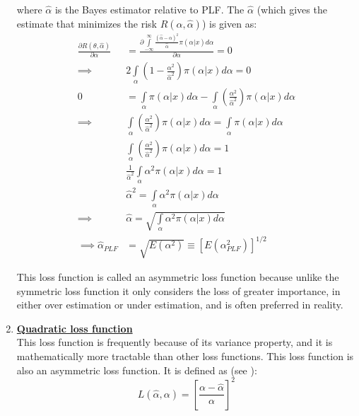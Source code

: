\documentclass[a4paper,12pt]{report}
\begin{document}
\begin{enumerate}
	
	where $\hat{\alpha}$ is the Bayes estimator relative to PLF. The $\hat{\alpha}$ (which gives the estimate that minimizes the risk $R(\alpha,\hat{\alpha})$) is given as:
	\begin{equation}\label{3.33}\begin{split}
	\frac{\partial R(\theta,\hat{\alpha})}{\partial \alpha}&=\frac{\partial\int\limits_{-\infty}^{\infty}\frac{(\hat{\alpha}-\alpha)^2}{\hat{\alpha}}\pi(\alpha|x)d\alpha}{\partial\alpha}=0\\
	\implies &2\int\limits_{\alpha}\left(1-\frac{\alpha^2}{\hat{\alpha}^2}\right)\pi(\alpha|x)d\alpha=0\\
	0&=\int\limits_{\alpha}\pi(\alpha|x)d\alpha-\int\limits_{\alpha}\left(\frac{\alpha^2}{\hat{\alpha}^2}\right)\pi(\alpha|x)d\alpha\\
	\implies&\int\limits_{\alpha}\left(\frac{\alpha^2}{\hat{\alpha}^2}\right)\pi(\alpha|x)d\alpha=\int\limits_{\alpha}\pi(\alpha|x)d\alpha\\
	&\int\limits_{\alpha}\left(\frac{\alpha^2}{\hat{\alpha}^2}\right)\pi(\alpha|x)d\alpha=1\\
	&\frac{1}{\hat{\alpha}^2}\int\limits_{\alpha}\alpha^2\pi(\alpha|x)d\alpha=1\\
	&\hat{\alpha}^2=\int\limits_{\alpha}\alpha^2\pi(\alpha|x)d\alpha\\
	\implies&\hat{\alpha}=\sqrt{\int\limits_{\alpha}\alpha^2\pi(\alpha|x)d\alpha}\\
	\implies\hat{\alpha}_{PLF}&=\sqrt{E(\alpha^2)}\equiv[E(\alpha_{PLF}^2)]^{1/2}
	\end{split}
	\end{equation}
	
	This loss function is called an asymmetric loss function because unlike the symmetric loss function it only considers the loss of greater importance, in either over estimation or under estimation, and is often preferred in reality.
	
	\item \noindent\textbf{\underline{Quadratic loss function}}\\
	This loss function is frequently because of its variance property, and it is mathematically more tractable than other loss functions. This loss function is also an asymmetric loss function. It is defined as (see \cite{zaka2014bayesian}):
	\begin{equation}
	L(\hat{\alpha},\alpha)=\left[\frac{\alpha-\hat{\alpha}}{\alpha}\right]^2
	\end{equation}
	


\end{enumerate}
\end{document}

